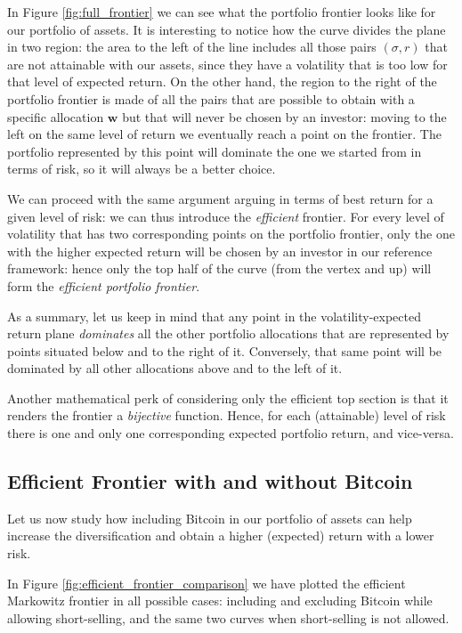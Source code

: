 In Figure \ref{fig:full_frontier} we can see what the portfolio frontier looks like for our portfolio of assets. 
It is interesting to notice how the curve divides the plane in two region: the area to the left of the line includes all those pairs $(\sigma, r)$ that are not attainable with our assets, since they have a volatility that is too low for that level of expected return. On the other hand, the region to the right of the portfolio frontier is made of all the pairs that are possible to obtain with a specific allocation $\mathbf{w}$ but that will never be chosen by an investor: moving to the left on the same level of return we eventually reach a point on the frontier. The portfolio represented by this point will dominate the one we started from in terms of risk, so it will always be a better choice.

We can proceed with the same argument arguing in terms of best return for a given level of risk: we can thus introduce the \textit{efficient} frontier. For every level of volatility that has two corresponding points on the portfolio frontier, only the one with the higher expected return will be chosen by an investor in our reference framework: hence only the top half of the curve (from the vertex and up) will form the \textit{efficient portfolio frontier}.

As a summary, let us keep in mind that any point in the volatility-expected return plane \textit{dominates} all the other portfolio allocations that are represented by points situated below and to the right of it. Conversely, that same point will be dominated by all other allocations above and to the left of it. 

Another mathematical perk of considering only the efficient top section is that it renders the frontier a \textit{bijective} function. Hence, for each (attainable) level of risk there is one and only one corresponding expected portfolio return, and vice-versa.


\subsection{Efficient Frontier with and without Bitcoin}

Let us now study how including Bitcoin in our portfolio of assets can help increase the diversification and obtain a higher (expected) return with a lower risk.

In Figure \ref{fig:efficient_frontier_comparison} we have plotted the efficient Markowitz frontier in all possible cases: including and excluding Bitcoin while allowing short-selling, and the same two curves when short-selling is not allowed.

